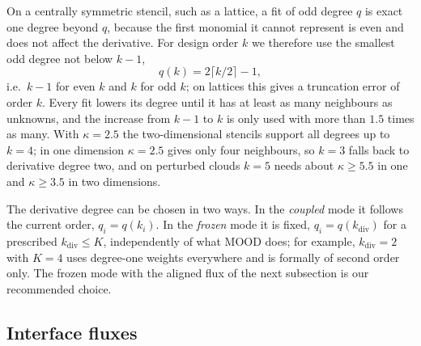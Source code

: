\documentclass[smallextended]{svjour3}
\numberwithin{equation}{section}
\newcommand{\qdiv}{q}
\begin{document}
On a centrally symmetric stencil, such as a lattice, a fit of odd degree $q$ is exact one degree beyond $q$, because the first monomial it cannot represent is even and does not affect the derivative. For design order $k$ we therefore use the smallest odd degree not below $k-1$,
\begin{equation}\label{eq:qk}
\qdiv(k) = 2\lceil k/2\rceil - 1,
\end{equation}
i.e.\ $k-1$ for even $k$ and $k$ for odd $k$; on lattices this gives a truncation error of order $k$. Every fit lowers its degree until it has at least as many neighbours as unknowns, and the increase from $k-1$ to $k$ is only used with more than $1.5$ times as many. With $\kappa=2.5$ the two-dimensional stencils support all degrees up to $k=4$; in one dimension $\kappa=2.5$ gives only four neighbours, so $k=3$ falls back to derivative degree two, and on perturbed clouds $k=5$ needs about $\kappa\ge5.5$ in one and $\kappa\ge3.5$ in two dimensions.

The derivative degree can be chosen in two ways. In the \emph{coupled} mode it follows the current order, $q_i=\qdiv(k_i)$. In the \emph{frozen} mode it is fixed, $q_i=\qdiv(k_{\mathrm{div}})$ for a prescribed $k_{\mathrm{div}}\le K$, independently of what MOOD does; for example, $k_{\mathrm{div}}=2$ with $K=4$ uses degree-one weights everywhere and is formally of second order only. The frozen mode with the aligned flux of the next subsection is our recommended choice.

\subsection{Interface fluxes}\label{sec:fluxes}
\end{document}

